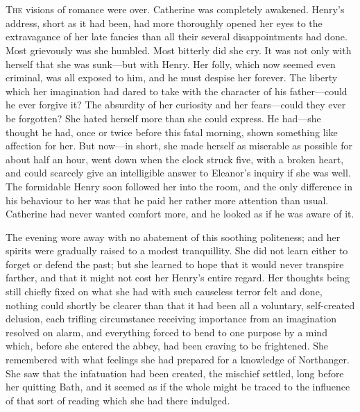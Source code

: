 \chapter[Chapter \thechapter]{} 

 \lettrine{T}{he} visions of romance were over. Catherine was completely awakened. Henry's address, short as it had been, had more thoroughly opened her eyes to the extravagance of her late fancies than all their several disappointments had done. Most grievously was she humbled. Most bitterly did she cry. It was not only with herself that she was sunk—but with Henry. Her folly, which now seemed even criminal, was all exposed to him, and he must despise her forever. The liberty which her imagination had dared to take with the character of his father—could he ever forgive it? The absurdity of her curiosity and her fears—could they ever be forgotten? She hated herself more than she could express. He had—she thought he had, once or twice before this fatal morning, shown something like affection for her. But now—in short, she made herself as miserable as possible for about half an hour, went down when the clock struck five, with a broken heart, and could scarcely give an intelligible answer to Eleanor's inquiry if she was well. The formidable Henry soon followed her into the room, and the only difference in his behaviour to her was that he paid her rather more attention than usual. Catherine had never wanted comfort more, and he looked as if he was aware of it. 

 The evening wore away with no abatement of this soothing politeness; and her spirits were gradually raised to a modest tranquillity. She did not learn either to forget or defend the past; but she learned to hope that it would never transpire farther, and that it might not cost her Henry's entire regard. Her thoughts being still chiefly fixed on what she had with such causeless terror felt and done, nothing could shortly be clearer than that it had been all a voluntary, self-created delusion, each trifling circumstance receiving importance from an imagination resolved on alarm, and everything forced to bend to one purpose by a mind which, before she entered the abbey, had been craving to be frightened. She remembered with what feelings she had prepared for a knowledge of Northanger. She saw that the infatuation had been created, the mischief settled, long before her quitting Bath, and it seemed as if the whole might be traced to the influence of that sort of reading which she had there indulged. 

